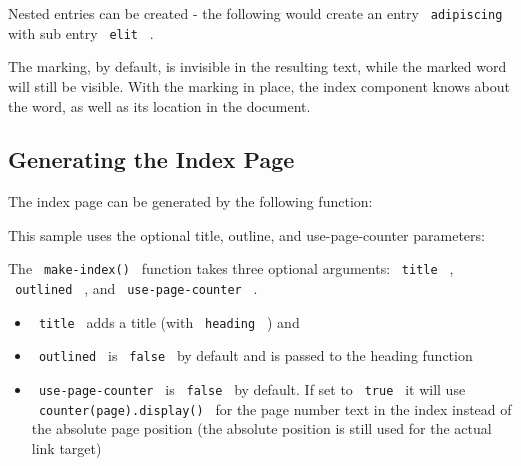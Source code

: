 Nested entries can be created - the following would create an entry
\texttt{\ adipiscing\ } with sub entry \texttt{\ elit\ } .

\begin{Shaded}
\begin{Highlighting}[]
\end{Highlighting}
\end{Shaded}

The marking, by default, is invisible in the resulting text, while the
marked word will still be visible. With the marking in place, the index
component knows about the word, as well as its location in the document.

\subsection{Generating the Index Page}\label{generating-the-index-page}

The index page can be generated by the following function:

\begin{Shaded}
\begin{Highlighting}[]
\NormalTok{\#columns(3)[}
\NormalTok{]}
\end{Highlighting}
\end{Shaded}

This sample uses the optional title, outline, and use-page-counter
parameters:

\begin{Shaded}
\begin{Highlighting}[]
\end{Highlighting}
\end{Shaded}

The \texttt{\ make-index()\ } function takes three optional arguments:
\texttt{\ title\ } , \texttt{\ outlined\ } , and
\texttt{\ use-page-counter\ } .

\begin{itemize}
\tightlist
\item
  \texttt{\ title\ } adds a title (with \texttt{\ heading\ } ) and
\item
  \texttt{\ outlined\ } is \texttt{\ false\ } by default and is passed
  to the heading function
\item
  \texttt{\ use-page-counter\ } is \texttt{\ false\ } by default. If set
  to \texttt{\ true\ } it will use \texttt{\ counter(page).display()\ }
  for the page number text in the index instead of the absolute page
  position (the absolute position is still used for the actual link
  target)
\end{itemize}

